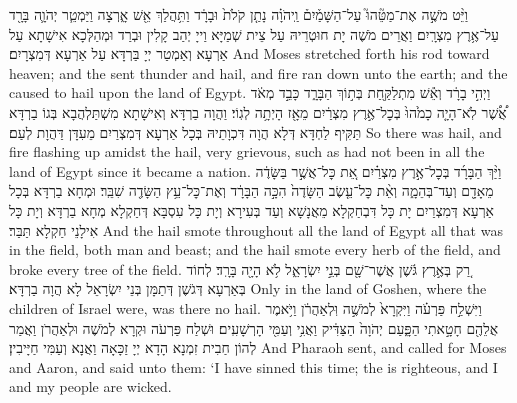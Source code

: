 {וַיֵּ֨ט מֹשֶׁ֣ה אֶת־מַטֵּ֘הוּ֮ עַל־הַשָּׁמַ֒יִם֒ וַֽיהֹוָ֗ה נָתַ֤ן קֹלֹת֙ וּבָרָ֔ד וַתִּ֥הֲלַךְ אֵ֖שׁ אָ֑רְצָה וַיַּמְטֵ֧ר יְהֹוָ֛ה בָּרָ֖ד עַל־אֶ֥רֶץ מִצְרָֽיִם׃}
{וַאֲרֵים מֹשֶׁה יָת חוּטְרֵיהּ עַל צֵית שְׁמַיָּא וַייָ יְהַב קָלִין וּבְרַד וּמְהַלְּכָא אִישָׁתָא עַל אַרְעָא וְאַמְטַר יְיָ בַּרְדָּא עַל אַרְעָא דְּמִצְרָיִם׃}
{And Moses stretched forth his rod toward heaven; and the \lord\space sent thunder and hail, and fire ran down unto the earth; and the \lord\space caused to hail upon the land of Egypt.}{}
{וַיְהִ֣י בָרָ֔ד וְאֵ֕שׁ מִתְלַקַּ֖חַת בְּת֣וֹךְ הַבָּרָ֑ד כָּבֵ֣ד מְאֹ֔ד אֲ֠שֶׁ֠ר לֹֽא־הָיָ֤ה כָמֹ֙הוּ֙ בְּכׇל־אֶ֣רֶץ מִצְרַ֔יִם מֵאָ֖ז הָיְתָ֥ה לְגֽוֹי׃
}
{וַהֲוָה בַרְדָּא וְאִישָׁתָא מִשְׁתַּלְהֲבָא בְּגוֹ בַרְדָּא תַּקִּיף לַחְדָּא דְּלָא הֲוָה דִּכְוָתֵיהּ בְּכָל אַרְעָא דְּמִצְרַיִם מֵעִדָּן דַּהֲוָת לְעַם׃}
{So there was hail, and fire flashing up amidst the hail, very grievous, such as had not been in all the land of Egypt since it became a nation.}{}
{וַיַּ֨ךְ הַבָּרָ֜ד בְּכׇל־אֶ֣רֶץ מִצְרַ֗יִם אֵ֚ת כׇּל־אֲשֶׁ֣ר בַּשָּׂדֶ֔ה מֵאָדָ֖ם וְעַד־בְּהֵמָ֑ה וְאֵ֨ת כׇּל־עֵ֤שֶׂב הַשָּׂדֶה֙ הִכָּ֣ה הַבָּרָ֔ד וְאֶת־כׇּל־עֵ֥ץ הַשָּׂדֶ֖ה שִׁבֵּֽר׃}
{וּמְחָא בַרְדָּא בְּכָל אַרְעָא דְּמִצְרַיִם יָת כָּל דִּבְחַקְלָא מֵאֲנָשָׁא וְעַד בְּעִירָא וְיָת כָּל עִסְבָּא דְּחַקְלָא מְחָא בַרְדָּא וְיָת כָּל אִילָנֵי חַקְלָא תַּבַּר׃}
{And the hail smote throughout all the land of Egypt all that was in the field, both man and beast; and the hail smote every herb of the field, and broke every tree of the field.}{}
{רַ֚ק בְּאֶ֣רֶץ גֹּ֔שֶׁן אֲשֶׁר־שָׁ֖ם בְּנֵ֣י יִשְׂרָאֵ֑ל לֹ֥א הָיָ֖ה בָּרָֽד׃}
{לְחוֹד בְּאַרְעָא דְּגֹשֶׁן דְּתַמָּן בְּנֵי יִשְׂרָאֵל לָא הֲוָה בַרְדָּא׃}
{Only in the land of Goshen, where the children of Israel were, was there no hail.}{}
{וַיִּשְׁלַ֣ח פַּרְעֹ֗ה וַיִּקְרָא֙ לְמֹשֶׁ֣ה וּֽלְאַהֲרֹ֔ן וַיֹּ֥אמֶר אֲלֵהֶ֖ם חָטָ֣אתִי הַפָּ֑עַם יְהֹוָה֙ הַצַּדִּ֔יק וַאֲנִ֥י וְעַמִּ֖י הָרְשָׁעִֽים׃}
{וּשְׁלַח פַּרְעֹה וּקְרָא לְמֹשֶׁה וּלְאַהֲרֹן וַאֲמַר לְהוֹן חַבִית זִמְנָא הָדָא יְיָ זַכָּאָה וַאֲנָא וְעַמִּי חַיָּיבִין׃}
{And Pharaoh sent, and called for Moses and Aaron, and said unto them: ‘I have sinned this time; the \lord\space is righteous, and I and my people are wicked.}{}
